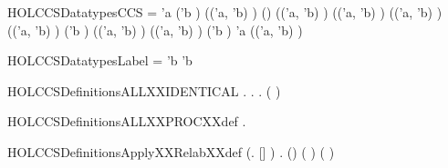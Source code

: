 \newcommand{\HOLCCSDate}{04 Settembre 2019}
\newcommand{\HOLCCSTime}{10:29}
\begin{SaveVerbatim}{HOLCCSDatatypesCCS}
 =
  \HOLTokenBar{}  'a
  \HOLTokenBar{}  ('b ) (('a, 'b) )
  \HOLTokenBar{} (\HOLSymConst{\ensuremath{+}}) (('a, 'b) ) (('a, 'b) )
  \HOLTokenBar{}  (('a, 'b) ) (('a, 'b) )
  \HOLTokenBar{} \HOLConst{\ensuremath{\nu}} ('b  \HOLTokenTransEnd {}) (('a, 'b) )
  \HOLTokenBar{}  (('a, 'b) ) ('b )
  \HOLTokenBar{}  'a (('a, 'b) )
\end{SaveVerbatim}
\newcommand{\HOLCCSDatatypesCCS}{\UseVerbatim{HOLCCSDatatypesCCS}}
\begin{SaveVerbatim}{HOLCCSDatatypesLabel}
 =  'b \HOLTokenBar{}  'b
\end{SaveVerbatim}
\newcommand{\HOLCCSDatatypesLabel}{\UseVerbatim{HOLCCSDatatypesLabel}}
\newcommand{\HOLCCSDatatypes}{
\HOLCCSDatatypesCCS\HOLCCSDatatypesLabel}
\begin{SaveVerbatim}{HOLCCSDefinitionsALLXXIDENTICAL}
\HOLTokenTurnstile{} \HOLSymConst{\HOLTokenForall{}}.   \HOLSymConst{\HOLTokenEquiv{}} \HOLSymConst{\HOLTokenExists{}}. \HOLSymConst{\HOLTokenForall{}}.    \HOLSymConst{\HOLTokenImp{}} ( \HOLSymConst{=} )
\end{SaveVerbatim}
\newcommand{\HOLCCSDefinitionsALLXXIDENTICAL}{\UseVerbatim{HOLCCSDefinitionsALLXXIDENTICAL}}
\begin{SaveVerbatim}{HOLCCSDefinitionsALLXXPROCXXdef}
\HOLTokenTurnstile{} \HOLSymConst{\HOLTokenForall{}}.   \HOLSymConst{\HOLTokenEquiv{}}   
\end{SaveVerbatim}
\newcommand{\HOLCCSDefinitionsALLXXPROCXXdef}{\UseVerbatim{HOLCCSDefinitionsALLXXPROCXXdef}}
\begin{SaveVerbatim}{HOLCCSDefinitionsApplyXXRelabXXdef}
\HOLTokenTurnstile{} (\HOLSymConst{\HOLTokenForall{}}.  []  \HOLSymConst{=} ) \HOLSymConst{\HOLTokenConj{}}
   \HOLSymConst{\HOLTokenForall{}}  .
        (\HOLSymConst{::})  \HOLSymConst{=}
          \HOLSymConst{=}    
          ( ) \HOLSymConst{=}    ( )
          
\end{SaveVerbatim}
